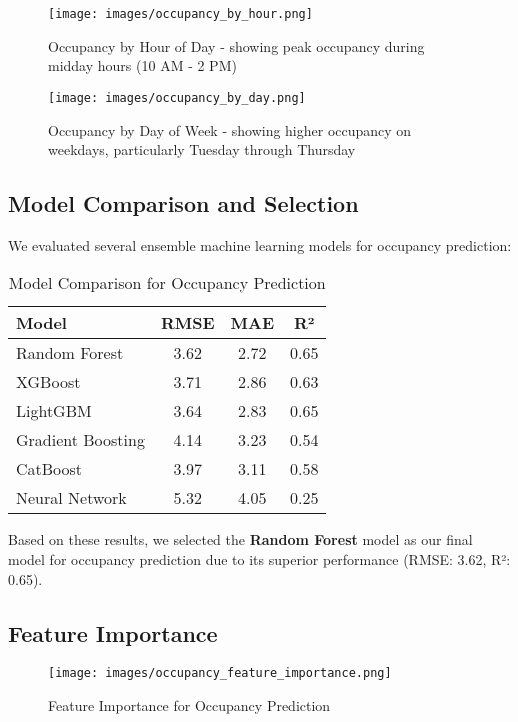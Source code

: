 \documentclass[12pt,letterpaper]{article}
\begin{document}
\begin{figure}[H]
    \centering
    \texttt{[image: images/occupancy\_by\_hour.png]}
    \caption{Occupancy by Hour of Day - showing peak occupancy during midday hours (10 AM - 2 PM)}
\end{figure}

\begin{figure}[H]
    \centering
    \texttt{[image: images/occupancy\_by\_day.png]}
    \caption{Occupancy by Day of Week - showing higher occupancy on weekdays, particularly Tuesday through Thursday}
\end{figure}

\subsection{Model Comparison and Selection}

We evaluated several ensemble machine learning models for occupancy prediction:

\begin{table}[H]
\centering
\begin{tabular}{lccc}
\toprule
\textbf{Model} & \textbf{RMSE} & \textbf{MAE} & \textbf{R²} \\
\midrule
Random Forest & 3.62 & 2.72 & 0.65 \\
XGBoost & 3.71 & 2.86 & 0.63 \\
LightGBM & 3.64 & 2.83 & 0.65 \\
Gradient Boosting & 4.14 & 3.23 & 0.54 \\
CatBoost & 3.97 & 3.11 & 0.58 \\
Neural Network & 5.32 & 4.05 & 0.25 \\
\bottomrule
\end{tabular}
\caption{Model Comparison for Occupancy Prediction}
\end{table}

Based on these results, we selected the \textbf{Random Forest} model as our final model for occupancy prediction due to its superior performance (RMSE: 3.62, R²: 0.65).

\subsection{Feature Importance}

\begin{figure}[H]
    \centering
    \texttt{[image: images/occupancy\_feature\_importance.png]}
    \caption{Feature Importance for Occupancy Prediction}
\end{figure}
\end{document}
